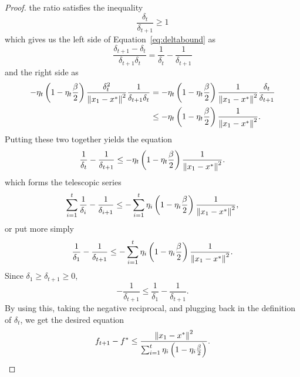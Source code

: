 \begin{proof}
    the ratio satisfies the inequality
    \begin{equation}
        \frac{\delta_t}{\delta_{t+1}} \geq 1
    \end{equation}
    which gives us the left side of Equation~\ref{eq:deltabound}  as
    \begin{equation}
        \frac{\delta_{t+1} - \delta_t}{ \delta_{t+1}\delta_t} =
        \frac{1}{\delta_t} - \frac{1}{\delta_{t + 1}}
    \end{equation}
    and the right side as 
    \begin{equation}
        \begin{aligned}
        -\eta_t \left( 1 - \eta_t \frac{\beta}{2} \right) \frac{\delta_t^2}{\left\| x_1 - x^* \right\|^2}
            {\frac{1}{\delta_{t+1}\delta_t} } &= 
        -\eta_t \left( 1 - \eta_t \frac{\beta}{2} \right)
        \frac{1}{\left\| x_1 - x^* \right\|^2}
            {\frac{\delta_t}{\delta_{t+1}} } \\ &\leq
        -\eta_t \left( 1 - \eta_t \frac{\beta}{2} \right)
        \frac{ 1}{\left\| x_1 - x^* \right\|^2}.
        \end{aligned}
    \end{equation}
    Putting these two together yields the equation
    \begin{equation}
        \frac{1}{\delta_t} - \frac{1}{\delta_{t + 1}} \leq
        -\eta_t \left( 1 - \eta_t \frac{\beta}{2} \right)
        \frac{1}{\left\| x_1 - x^* \right\|^2}.
    \end{equation}
    which forms the telescopic series
    \begin{equation}
        \sum^{t}_{i=1} \frac{1}{\delta_i} - \frac{1}{\delta_{i + 1}} \leq
        -\sum^{t}_{i=1} \eta_i \left( 1 - \eta_i \frac{\beta}{2} \right)
        \frac{1}{\left\| x_1 - x^* \right\|^2},
    \end{equation}
    or put more simply
    \begin{equation}
       \frac{1}{\delta_1} - \frac{1}{\delta_{t + 1}} \leq
        -\sum^{t}_{i=1} \eta_i \left( 1 - \eta_i \frac{\beta}{2} \right)
        \frac{1}{\left\| x_1 - x^* \right\|^2}.
    \end{equation}
    Since $\delta_1 \geq \delta_{t+1} \geq 0$,
    \begin{equation}
        - \frac{1}{\delta_{t+1}} \leq \frac{1}{\delta_1} - \frac{1}{\delta_{t+1}}.
    \end{equation}
    By using this, taking the negative reciprocal, and plugging back in the
    definition of $\delta_t$, we get the desired equation
    \begin{equation}
      f_{t + 1} - f^* \leq
        \frac{\left\| x_1 - x^* \right\|^2}{\sum^{t}_{i=1} \eta_i \left( 1 - \eta_i \frac{\beta}{2} \right)}.
    \end{equation}
\end{proof}

